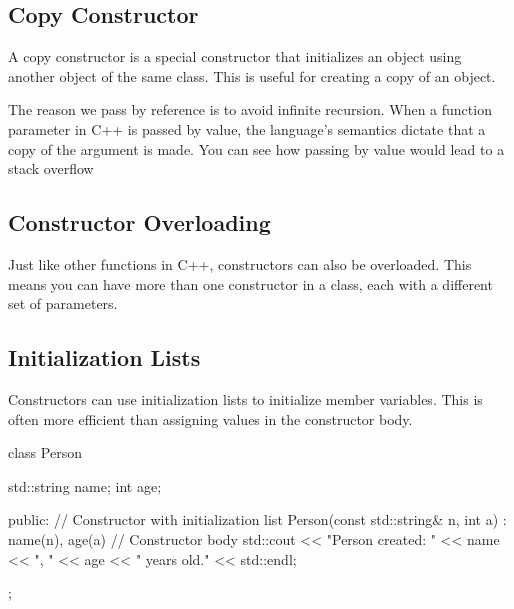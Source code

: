 \documentclass{report}
\begin{document}
    \subsection{Copy Constructor}
    \bigbreak \noindent 
    \begin{concept}
        A copy constructor is a special constructor that initializes an object using another object of the same class. This is useful for creating a copy of an object.
    \end{concept}
    \bigbreak \noindent 
    \begin{cppcode}
class Rectangle {
    int width, height;
public:

// Copy constructor
    Rectangle(const Rectangle& other) {
        width = other.width;
        height = other.height;
    }
];
    \end{cppcode}
    \bigbreak \noindent 
    \begin{notebox}
        The reason we pass by reference is to avoid infinite recursion. When a function parameter in C++ is passed by value, the language's semantics dictate that a copy of the argument is made. You can see how passing by value would lead to a stack overflow
    \end{notebox}
    
    
    \bigbreak \noindent 
    \subsection{Constructor Overloading}
    \bigbreak \noindent 
    \begin{concept}
        Just like other functions in C++, constructors can also be overloaded. This means you can have more than one constructor in a class, each with a different set of parameters.
    \end{concept}

    \pagebreak \bigbreak \noindent 
    \subsection{Initialization Lists}
    \bigbreak \noindent 
    \begin{concept}
        Constructors can use initialization lists to initialize member variables. This is often more efficient than assigning values in the constructor body.
    \end{concept}
    \bigbreak \noindent 
    \begin{cppcode}
  class Person {
    std::string name;
    int age;

public:
    // Constructor with initialization list
    Person(const std::string& n, int a) : name(n), age(a) {
        // Constructor body
        std::cout << "Person created: " << name << ", " << age << " years old." << std::endl;
    }  
};
    \end{cppcode}
\end{document}
